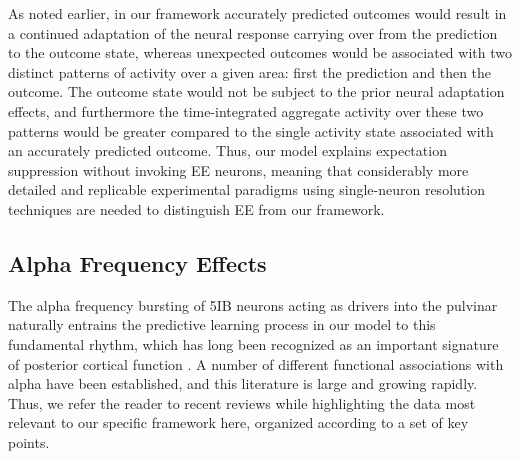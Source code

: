 \documentclass[11pt,twoside]{article}
\newif\myifpdf
\begin{document}
As noted earlier, in our framework accurately predicted outcomes would result in a continued adaptation of the neural response carrying over from the prediction to the outcome state, whereas unexpected outcomes would be associated with two distinct patterns of activity over a given area: first the prediction and then the outcome.  The outcome state would not be subject to the prior neural adaptation effects, and furthermore the time-integrated aggregate activity over these two patterns would be greater compared to the single activity state associated with an accurately predicted outcome.  Thus, our model explains expectation suppression without invoking EE neurons, meaning that considerably more detailed and replicable experimental paradigms using single-neuron resolution techniques are needed to distinguish EE from our framework.

\subsection{Alpha Frequency Effects}

The alpha frequency bursting of 5IB neurons acting as drivers into the pulvinar naturally entrains the predictive learning process in our model to this fundamental rhythm, which has long been recognized as an important signature of posterior cortical function \citep{Berger29,Walter53,NunnOsselton74,VarelaToroJohnEtAl81,VanRullenKoch03}.  A number of different functional associations with alpha have been established, and this literature is large and growing rapidly.  Thus, we refer the reader to recent reviews \citep{JensenBonnefondMarshallEtAl15,VanRullen16,ClaytonYeungKadosh18,FosterAwh19} while highlighting the data most relevant to our specific framework here, organized according to a set of key points.
\end{document}
